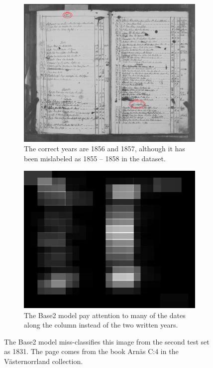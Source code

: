 
\begin{figure}
    \centering
    \begin{subfigure}[c]{1.0\textwidth}
        \centering    \includegraphics[scale=0.56]{resources/SWE_attention/33SQ-GRNM-9CM6.jpg}
        \caption{The correct years are 1856 and 1857, although it has been mislabeled as 1855 -- 1858 in the dataset.}
    \end{subfigure}

    \vspace{1em}

    \begin{subfigure}[t]{1.0\textwidth}
        \centering
        \includegraphics[scale=1.0]{resources/SWE_attention/Base2/att_33SQ-GRNM-9CM6.jpg}
        \caption{The Base2 model pay attention to many of the dates along the column instead of the two written years.}
    \end{subfigure}

    \caption{The Base2 model miss-classifies this image from the second test set as 1831. The page comes from the book Arnäs C:4 in the Västernorrland collection.}
    \label{fig:attention_dep_9CM6}
\end{figure}
